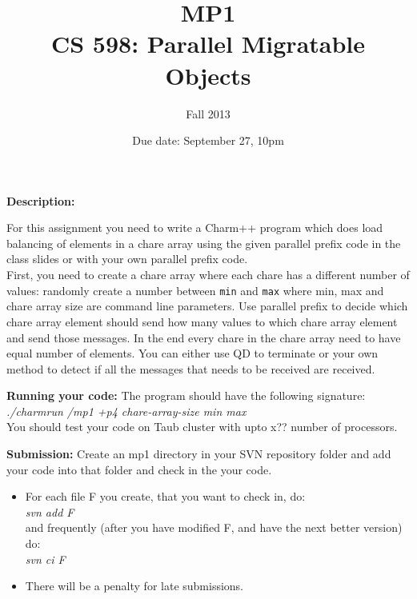 \documentclass{article}
\title{MP1 \\ CS 598: Parallel Migratable Objects}
\author{Fall 2013}
\date{Due date: September 27, 10pm}
\begin{document}
\maketitle

\textbf{Description:} 

For this assignment you need to write a Charm++ program which does load
balancing of elements in a chare array using the given parallel prefix code in
the class slides or with your own parallel prefix code. \\
First, you need to create a chare array where each chare has a different number 
of values: randomly create a number between \texttt{min} and \texttt{max} where
min, max and chare array size are command line parameters. 
Use parallel prefix to
decide which chare array element should send how many values to which chare
array element and send those messages. In the end every chare in the chare array
need to have equal number of elements. You can either use QD to terminate or
your own method to detect if all the messages that needs to be received are
received. 

\textbf{Running your code:}
The program should have the following signature:
\textit{./charmrun /mp1 +p4 chare-array-size min max} \\
You should test your code on Taub cluster with upto x?? number of processors.

\textbf{Submission:}
Create an mp1 directory in your SVN repository folder and add your code into
that folder and check in the your code.
\begin{itemize}
\item  For each file F you create, that you want to check in, do: \\
        \textit{svn add F}\\
        and frequently (after you have modified F, and have the next better
        version) do:\\ 
        \textit{svn ci F}
\item  There will be a penalty for late submissions.
\end{itemize}
\end{document}
